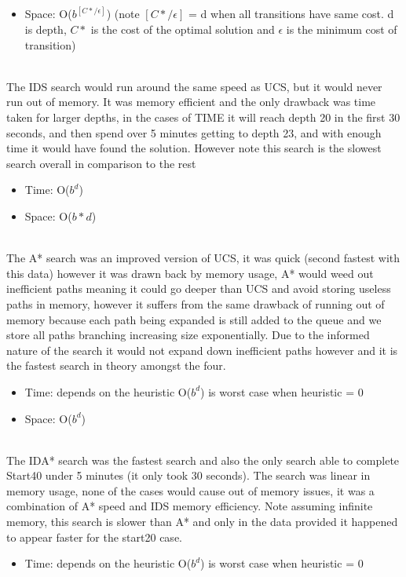 \documentclass{article}
\newcommand*\fixindent{ \hspace{1pt}\\}
\begin{document}
\begin{enumerate}[a)]
\begin{itemize}
            \item Space: O($b^{[C*/\epsilon]}$) (note $[C*/\epsilon]$ = d when all transitions have same cost. d is depth, $C*$ is the cost of the optimal solution and $\epsilon$ is the minimum cost of transition)
        \end{itemize}
    \fixindent{}
    The IDS search would run around the same speed as UCS, but it would never run out of memory. It was memory efficient and the only drawback was time taken for larger depths, in the cases of TIME it will reach depth 20 in the first 30 seconds, and then spend over 5 minutes getting to depth 23, and with enough time it would have found the solution. However note this search is the slowest search overall in comparison to the rest
        \begin{itemize}
            \item Time: O($b^d$)
            \item Space: O($b*d$)
        \end{itemize}
    \fixindent{}
    The A* search was an improved version of UCS, it was quick (second fastest with this data) however it was drawn back by memory usage, A* would weed out inefficient paths meaning it could go deeper than UCS and avoid storing useless paths in memory, however it suffers from the same drawback of running out of memory because each path being expanded is still added to the queue and we store all paths branching increasing size exponentially. Due to the informed nature of the search it would not expand down inefficient paths however and it is the fastest search in theory amongst the four.
        \begin{itemize}
            \item Time: depends on the heuristic O($b^d$) is worst case when heuristic = 0
            \item Space: O($b^d$)
        \end{itemize}
    \fixindent{}
    The IDA* search was the fastest search and also the only search able to complete Start40 under 5 minutes (it only took 30 seconds). The search was linear in memory usage, none of the cases would cause out of memory issues, it was a combination of A* speed and IDS memory efficiency. Note assuming infinite memory, this search is slower than A* and only in the data provided it happened to appear faster for the  start20 case.
        \begin{itemize}
            \item Time: depends on the heuristic O($b^d$) is worst case when heuristic = 0

\end{itemize}
\end{enumerate}
\end{document}
